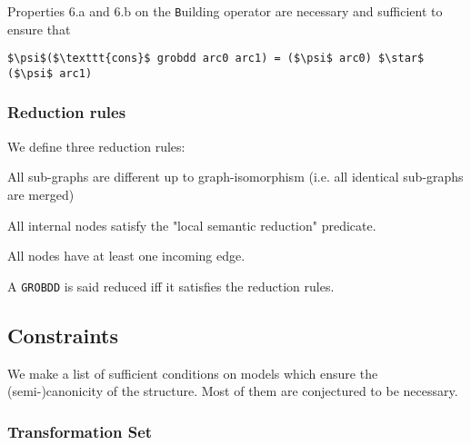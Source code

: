 \documentclass[a4paper,10pt]{article}
\newcommand{\GroBdd}{\texttt{GROBDD}}
\begin{document}
Properties 6.a and 6.b on the \texttt{B}uilding operator are necessary and sufficient to ensure that
\begin{lstlisting}
$\psi$($\texttt{cons}$ grobdd arc0 arc1) = ($\psi$ arc0) $\star$ ($\psi$ arc1)
\end{lstlisting}

\subsubsection{Reduction rules}

We define three reduction rules: \begin{compactenum}
\item All sub-graphs are different up to graph-isomorphism (i.e. all identical sub-graphs are merged)
\item All internal nodes satisfy the "local semantic reduction" predicate.
\item All nodes have at least one incoming edge.
\end{compactenum}
A \GroBdd{} is said reduced iff it satisfies the reduction rules.

\subsection{Constraints}
We make a list of sufficient conditions on models which ensure the (semi-)canonicity of the structure.
Most of them are conjectured to be necessary.
\subsubsection{Transformation Set}
\end{document}
